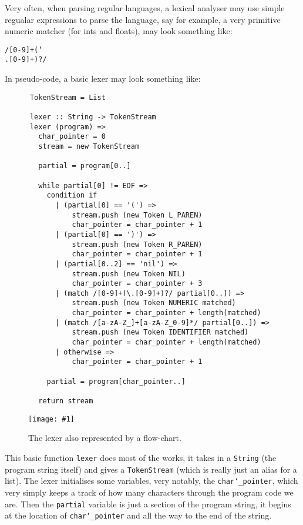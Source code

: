 \documentclass{article}
\newcommand{\code}[1]{\texttt{#1}}
\newcommand{\graph}[2]{
  \begin{figure}[H]
    \centering
    \texttt{[image: \#1]}
    \caption{#2}
  \end{figure}
}
\begin{document}
      \clearpage

      Very often, when parsing regular languages, a lexical analyser may use
      simple regualar expressions to parse the language, say for example, a
      very primitive numeric matcher (for ints and floats), may look something
      like:

      \centerline{\code{/[0-9]+(\char`\\.[0-9]+)?/}}

      In pseudo-code, a basic lexer may look something like:

      \begin{verbatim}
      TokenStream = List

      lexer :: String -> TokenStream
      lexer (program) =>
        char_pointer = 0
        stream = new TokenStream

        partial = program[0..]

        while partial[0] != EOF =>
          condition if
            | (partial[0] == '(') =>
                stream.push (new Token L_PAREN)
                char_pointer = char_pointer + 1
            | (partial[0] == ')') =>
                stream.push (new Token R_PAREN)
                char_pointer = char_pointer + 1
            | (partial[0..2] == 'nil') =>
                stream.push (new Token NIL)
                char_pointer = char_pointer + 3
            | (match /[0-9]+(\.[0-9]+)?/ partial[0..]) =>
                stream.push (new Token NUMERIC matched)
                char_pointer = char_pointer + length(matched)
            | (match /[a-zA-Z_]+[a-zA-Z_0-9]*/ partial[0..]) =>
                stream.push (new Token IDENTIFIER matched)
                char_pointer = char_pointer + length(matched)
            | otherwise =>
                char_pointer = char_pointer + 1

          partial = program[char_pointer..]

        return stream
      \end{verbatim}

      \graph{lexer-flow}{The lexer also represented by a flow-chart.}

      This basic function \code{lexer} does most of the works, it takes in a
      \code{String} (the program string itself) and gives a \code{TokenStream}
      (which is really just an alias for a list). The lexer initialises some
      variables, very notably, the \code{char\char`_pointer}, which very simply keeps
      a track of how many characters through the program code we are. Then the
      \code{partial} variable is just a section of the program string, it begins
      at the location of \code{char\char`_pointer} and all the way to the end
      of the string.\\
\end{document}
